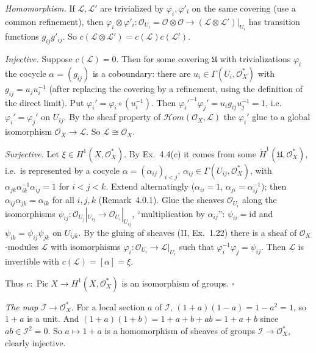 \documentclass[11pt]{article}
\begin{document}
\emph{Homomorphism.} If $\mathcal L,\mathcal L'$ are trivialized by $\varphi_i,\varphi'_i$ on the same covering (use a common refinement), then $\varphi_i\otimes\varphi'_i:\mathcal O_{U_i}=\mathcal O\otimes\mathcal O\to(\mathcal L\otimes\mathcal L')|_{U_i}$ has transition functions $g_{ij}g'_{ij}$. So $c(\mathcal L\otimes\mathcal L')=c(\mathcal L)c(\mathcal L')$.

\emph{Injective.} Suppose $c(\mathcal L)=0$. Then for some covering $\mathfrak U$ with trivializations $\varphi_i$ the cocycle $\alpha=(g_{ij})$ is a coboundary: there are $u_i\in\Gamma(U_i,\mathcal O_X^*)$ with $g_{ij}=u_ju_i^{-1}$ (after replacing the covering by a refinement, using the definition of the direct limit). Put $\varphi_i'=\varphi_i\circ(u_i^{-1})$. Then $\varphi_i'^{-1}\varphi_j'=u_ig_{ij}u_j^{-1}=1$, i.e.\ $\varphi_i'=\varphi_j'$ on $U_{ij}$. By the sheaf property of $\mathcal Hom(\mathcal O_X,\mathcal L)$ the $\varphi_i'$ glue to a global isomorphism $\mathcal O_X\to\mathcal L$. So $\mathcal L\cong\mathcal O_X$.

\emph{Surjective.} Let $\xi\in H^1(X,\mathcal O_X^*)$. By Ex.~4.4(c) it comes from some $\check H^1(\mathfrak U,\mathcal O_X^*)$, i.e.\ is represented by a cocycle $\alpha=(\alpha_{ij})_{i<j}$, $\alpha_{ij}\in\Gamma(U_{ij},\mathcal O_X^*)$, with $\alpha_{jk}\alpha_{ik}^{-1}\alpha_{ij}=1$ for $i<j<k$. Extend alternatingly ($\alpha_{ii}=1$, $\alpha_{ji}=\alpha_{ij}^{-1}$); then $\alpha_{ij}\alpha_{jk}=\alpha_{ik}$ for all $i,j,k$ (Remark~4.0.1). Glue the sheaves $\mathcal O_{U_i}$ along the isomorphisms $\psi_{ij}:\mathcal O_{U_j}|_{U_{ij}}\to\mathcal O_{U_i}|_{U_{ij}}$, ``multiplication by $\alpha_{ij}$'': $\psi_{ii}=\mathrm{id}$ and $\psi_{ik}=\psi_{ij}\psi_{jk}$ on $U_{ijk}$. By the gluing of sheaves (II, Ex.~1.22) there is a sheaf of $\mathcal O_X$-modules $\mathcal L$ with isomorphisms $\varphi_i:\mathcal O_{U_i}\to\mathcal L|_{U_i}$ such that $\varphi_i^{-1}\varphi_j=\psi_{ij}$. Then $\mathcal L$ is invertible with $c(\mathcal L)=[\alpha]=\xi$.

Thus $c:\operatorname{Pic}X\to H^1(X,\mathcal O_X^*)$ is an isomorphism of groups. \hfill$\square$

\pf
\emph{The map $\mathcal I\to\mathcal O_X^*$.} For a local section $a$ of $\mathcal I$, $(1+a)(1-a)=1-a^2=1$, so $1+a$ is a unit. And $(1+a)(1+b)=1+a+b+ab=1+a+b$ since $ab\in\mathcal I^2=0$. So $a\mapsto1+a$ is a homomorphism of sheaves of groups $\mathcal I\to\mathcal O_X^*$, clearly injective.
\end{document}
